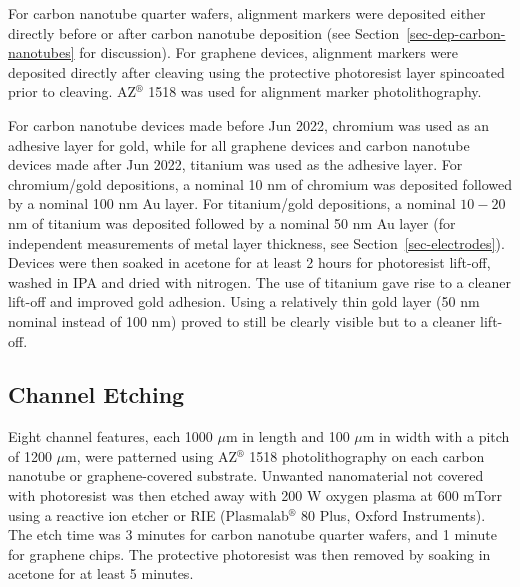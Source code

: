 \documentclass[
  a4paper,
]{scrbook}
\begin{document}
For carbon nanotube quarter wafers, alignment markers were deposited
either directly before or after carbon nanotube deposition (see
Section~\ref{sec-dep-carbon-nanotubes} for discussion). For graphene
devices, alignment markers were deposited directly after cleaving using
the protective photoresist layer spincoated prior to cleaving.
AZ\(^\circledR\) 1518 was used for alignment marker photolithography.

For carbon nanotube devices made before Jun 2022, chromium was used as
an adhesive layer for gold, while for all graphene devices and carbon
nanotube devices made after Jun 2022, titanium was used as the adhesive
layer. For chromium/gold depositions, a nominal 10 nm of chromium was
deposited followed by a nominal 100 nm Au layer. For titanium/gold
depositions, a nominal \(10-20\) nm of titanium was deposited followed
by a nominal 50 nm Au layer (for independent measurements of metal layer
thickness, see Section~\ref{sec-electrodes}). Devices were then soaked
in acetone for at least 2 hours for photoresist lift-off, washed in IPA
and dried with nitrogen. The use of titanium gave rise to a cleaner
lift-off and improved gold adhesion. Using a relatively thin gold layer
(50 nm nominal instead of 100 nm) proved to still be clearly visible but
to a cleaner lift-off.

\hypertarget{channel-etching}{%
\subsection{Channel Etching}\label{channel-etching}}

Eight channel features, each 1000 \(\mu\)m in length and 100 \(\mu\)m in
width with a pitch of 1200 \(\mu\)m, were patterned using
AZ\(^\circledR\) 1518 photolithography on each carbon nanotube or
graphene-covered substrate. Unwanted nanomaterial not covered with
photoresist was then etched away with 200 W oxygen plasma at 600 mTorr
using a reactive ion etcher or RIE (Plasmalab\(^\circledR\) 80 Plus,
Oxford Instruments). The etch time was 3 minutes for carbon nanotube
quarter wafers, and 1 minute for graphene chips. The protective
photoresist was then removed by soaking in acetone for at least 5
minutes.
\end{document}
